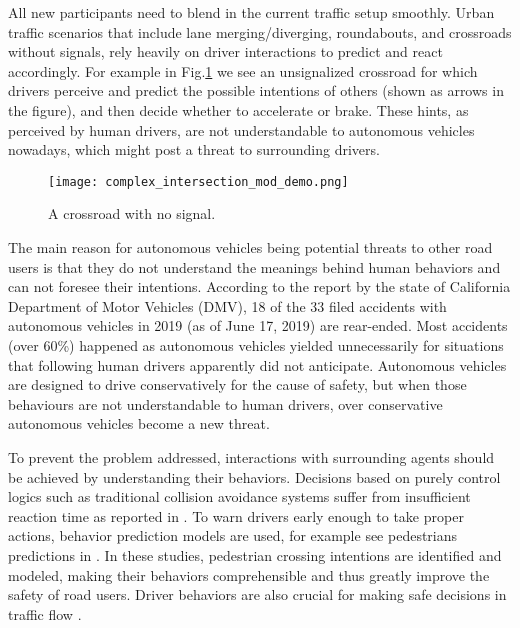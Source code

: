 All new participants need to blend in the current traffic setup   smoothly. Urban traffic scenarios that include lane merging/diverging,  roundabouts, and crossroads without signals, rely heavily on driver interactions to predict and react accordingly. For example in Fig.\ref{INTERSECTION} we see an unsignalized crossroad for which drivers perceive and predict the possible intentions of others (shown as arrows in the figure), and then decide whether to accelerate or brake. These hints, as perceived by human drivers, are not understandable to autonomous vehicles nowadays, which might post a threat to surrounding drivers.

\begin{figure}[h!]
\begin{center}
\texttt{[image: complex\_intersection\_mod\_demo.png]}
\end{center}
\caption{A crossroad with no signal.}
\label{INTERSECTION} 
\end{figure}

The main reason for autonomous vehicles being potential threats to other road users is that they do not understand the meanings behind human behaviors and can not foresee their intentions. According to the report by the state of California Department of Motor Vehicles (DMV), 18 of the 33 filed accidents with autonomous vehicles in 2019 (as of June 17, 2019) are rear-ended\cite{CADMV}. Most accidents (over 60\%) happened as autonomous vehicles yielded unnecessarily for situations that following human drivers apparently did not anticipate. Autonomous vehicles are designed to drive conservatively for the cause of safety, but when those behaviours are not understandable to human drivers, over conservative autonomous vehicles become a new threat.


To prevent the problem addressed, interactions with surrounding agents should be achieved by understanding their behaviors. Decisions based on purely control logics such as traditional collision avoidance systems suffer from insufficient reaction time as reported in \cite{Coelingh2010}. To warn drivers early enough to take proper actions, behavior prediction models are used, for example see  pedestrians predictions in \cite{Bonnin2014, Schneemann2016, HASHIMOTO2016}. In these studies, pedestrian crossing intentions are identified and modeled, making their behaviors comprehensible and thus greatly improve the safety of road users. Driver behaviors are also crucial for making safe decisions in traffic flow \cite{Ramyar2015, Gadepally2014}.

